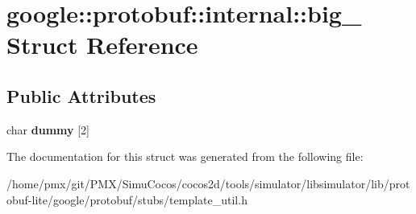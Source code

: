 \hypertarget{structgoogle_1_1protobuf_1_1internal_1_1big__}{}\section{google\+:\+:protobuf\+:\+:internal\+:\+:big\+\_\+ Struct Reference}
\label{structgoogle_1_1protobuf_1_1internal_1_1big__}
\subsection*{Public Attributes}
\begin{DoxyCompactItemize}
\item 
\mbox{\label{structgoogle_1_1protobuf_1_1internal_1_1big___a75594724b02189cd494d6f7e43c9d437}} 
char {\bfseries dummy} \mbox{[}2\mbox{]}
\end{DoxyCompactItemize}


The documentation for this struct was generated from the following file\+:\begin{DoxyCompactItemize}
\item 
/home/pmx/git/\+P\+M\+X/\+Simu\+Cocos/cocos2d/tools/simulator/libsimulator/lib/protobuf-\/lite/google/protobuf/stubs/template\+\_\+util.\+h\end{DoxyCompactItemize}
